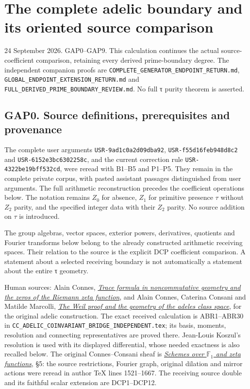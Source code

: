 \section{The complete adelic boundary and its oriented source
comparison}\label{the-complete-adelic-boundary-and-its-oriented-source-comparison}

24 September 2026. GAP0--GAP9. This calculation continues the actual
source-coefficient comparison, retaining every derived prime-boundary
degree. The independent companion proofs are
\nolinkurl{COMPLETE_GENERATOR_ENDPOINT_RETURN.md},
\nolinkurl{GLOBAL_ENDPOINT_EXTENSION_RETURN.md} and
\nolinkurl{FULL_DERIVED_PRIME_BOUNDARY_REVIEW.md}. No full τ purity theorem is
asserted.

\subsection{GAP0. Source definitions, prerequisites and
provenance}\label{gap0.-source-definitions-prerequisites-and-provenance}

The complete user arguments \nolinkurl{USR-9ad1c0a2d09dba92}, \nolinkurl{USR-f55d16feb948d8c2}
and \nolinkurl{USR-6152e3bc6302258c}, and the current correction rule
\nolinkurl{USR-4322be19bff532cd}, were reread with B1--B5 and P1--P5. They remain in
the complete private corpus, with pasted assistant passages
distinguished from user arguments. The full arithmetic reconstruction
precedes the coefficient operations below. The notation remains \(Z_0\)
for absence, \(Z_1\) for primitive presence \(\tau\) without \(Z_2\)
parity, and the specified integer data with their \(Z_2\) parity. No
source addition on \(\tau\) is introduced.

The group algebras, vector spaces, exterior powers, derivatives,
quotients and Fourier transforms below belong to the already constructed
arithmetic receiving spaces. Their relation to the source is the
explicit DCP coefficient comparison. A statement about a selected
receiving boundary is not automatically a statement about the entire τ
geometry.

Human sources: Alain Connes,
\href{https://arxiv.org/abs/math/9811068v1}{\emph{Trace formula in
noncommutative geometry and the zeros of the Riemann zeta function}},
and Alain Connes, Caterina Consani and Matilde Marcolli,
\href{https://arxiv.org/abs/math/0703392v1}{\emph{The Weil proof and the
geometry of the adeles class space}}, for the original adelic
construction. The exact received calculation is ABR1--ABR30 in
\nolinkurl{CC_ADELIC_COINVARIANT_BRIDGE_INDEPENDENT.tex}; its basis, moments,
resolution and connecting representatives are proved there. Jean-Louis
Koszul's resolution is used with its displayed differential, whose
needed exactness is also recalled below. The original Connes--Consani
sheaf is \href{https://arxiv.org/abs/0903.2024v3}{\emph{Schemes over
\(\mathbb F_1\) and zeta functions}}, §5: the source restrictions,
Fourier graph, original dilation and mirror actions were reread in
author TeX lines 1521--1667. The receiving source double and its
faithful scalar extension are DCP1--DCP12.

